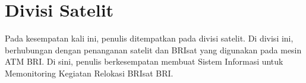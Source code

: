 \section{Divisi Satelit}
\tab Pada kesempatan kali ini, penulis ditempatkan pada divisi satelit. Di divisi ini, berhubungan dengan penanganan satelit dan BRIsat yang digunakan pada mesin ATM BRI. Di sini, penulis berkesempatan membuat Sistem Informasi untuk Memonitoring Kegiatan Relokasi BRIsat BRI.

\cleardoublepage